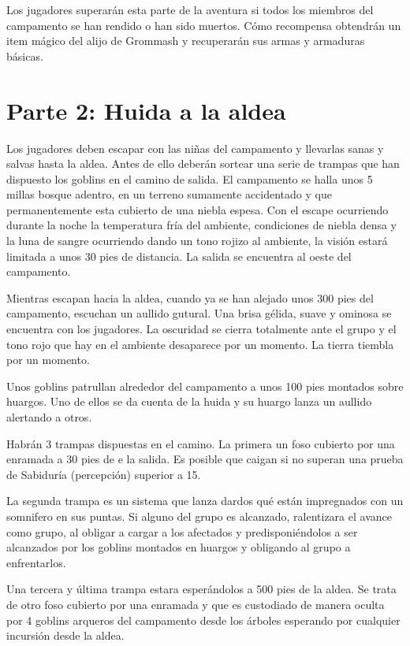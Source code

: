 \documentclass[10pt,twoside,twocolumn,openany]{dndbook}
\begin{document}
Los jugadores superarán esta parte de la aventura si todos los miembros del campamento se han rendido 
o han sido muertos. Cómo recompensa obtendrán un item mágico del alijo de Grommash y recuperarán sus 
armas y armaduras básicas.


\section{Parte 2: Huida a la aldea}

Los jugadores deben escapar con las niñas del campamento y llevarlas sanas y salvas hasta la aldea. 
Antes de ello deberán sortear una serie de trampas que han dispuesto los goblins en el camino de salida. 
El campamento se halla unos 5 millas bosque adentro, en un terreno sumamente accidentado y que 
permanentemente esta cubierto de una niebla espesa. Con el escape ocurriendo durante la noche 
la temperatura fría del ambiente, condiciones de niebla densa y la luna de sangre ocurriendo dando 
un tono rojizo al ambiente, la visión estará limitada a unos 30 pies de distancia. La salida se 
encuentra al oeste del campamento.

\begin{DndReadAloud}
Mientras escapan hacia la aldea, cuando ya se han alejado unos 300 pies del campamento, escuchan 
un aullido gutural. Una brisa gélida, suave y ominosa se encuentra con los jugadores. La oscuridad
se cierra totalmente ante el grupo y el tono rojo que hay en el ambiente desaparece por un momento.
La tierra tiembla por un momento.
\end{DndReadAloud}

Unos goblins patrullan alrededor del campamento a unos 100 pies montados sobre huargos. Uno de ellos
se da cuenta de la huida y su huargo lanza un aullido alertando a otros.

Habrán 3 trampas dispuestas en el camino. La primera un foso cubierto por una enramada a 30 pies de e
la salida. Es posible que caigan si no superan una prueba de Sabiduría (percepción) superior a 15.

La segunda trampa es un sistema que lanza dardos qué están impregnados con un somnifero en sus puntas. 
Si alguno del grupo es alcanzado, ralentizara el avance como grupo, al obligar a cargar a los afectados 
y predisponiéndolos a ser alcanzados por los goblins montados en huargos y obligando al grupo a 
enfrentarlos.

Una tercera y última trampa estara esperándolos a 500 pies de la aldea. Se trata de otro foso cubierto
por una enramada y que es custodiado de manera oculta por 4 goblins arqueros del campamento desde los 
árboles esperando por cualquier incursión desde la aldea. 
\end{document}
